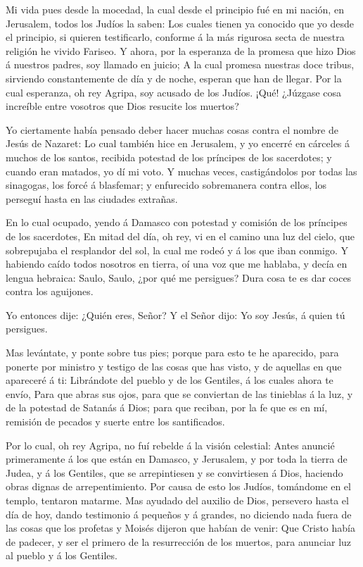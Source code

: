  Mi vida pues desde la mocedad, la cual desde el principio
fué en mi nación, en Jerusalem, todos los Judíos la saben:
 Los cuales tienen ya conocido que yo desde el principio,
si quieren testificarlo, conforme á la más rigurosa secta de nuestra
religión he vivido Fariseo.  Y ahora, por la esperanza de
la promesa que hizo Dios á nuestros padres, soy llamado en juicio;
 A la cual promesa nuestras doce tribus, sirviendo
constantemente de día y de noche, esperan que han de llegar. Por la cual
esperanza, oh rey Agripa, soy acusado de los Judíos. 
¡Qué! ¿Júzgase cosa increíble entre vosotros que Dios resucite los
muertos?

 Yo ciertamente había pensado deber hacer muchas cosas
contra el nombre de Jesús de Nazaret:  Lo cual también
hice en Jerusalem, y yo encerré en cárceles á muchos de los santos,
recibida potestad de los príncipes de los sacerdotes; y cuando eran
matados, yo dí mi voto.  Y muchas veces, castigándolos
por todas las sinagogas, los forcé á blasfemar; y enfurecido sobremanera
contra ellos, los perseguí hasta en las ciudades extrañas.

 En lo cual ocupado, yendo á Damasco con potestad y
comisión de los príncipes de los sacerdotes,  En mitad
del día, oh rey, vi en el camino una luz del cielo, que sobrepujaba el
resplandor del sol, la cual me rodeó y á los que iban conmigo.
 Y habiendo caído todos nosotros en tierra, oí una voz
que me hablaba, y decía en lengua hebraica: Saulo, Saulo, ¿por qué me
persigues? Dura cosa te es dar coces contra los aguijones.

 Yo entonces dije: ¿Quién eres, Señor? Y el Señor dijo:
Yo soy Jesús, á quien tú persigues.

 Mas levántate, y ponte sobre tus pies; porque para esto
te he aparecido, para ponerte por ministro y testigo de las cosas que
has visto, y de aquellas en que apareceré á ti: 
Librándote del pueblo y de los Gentiles, á los cuales ahora te envío,
 Para que abras sus ojos, para que se conviertan de las
tinieblas á la luz, y de la potestad de Satanás á Dios; para que
reciban, por la fe que es en mí, remisión de pecados y suerte entre los
santificados.

 Por lo cual, oh rey Agripa, no fuí rebelde á la visión
celestial:  Antes anuncié primeramente á los que están en
Damasco, y Jerusalem, y por toda la tierra de Judea, y á los Gentiles,
que se arrepintiesen y se convirtiesen á Dios, haciendo obras dignas de
arrepentimiento.  Por causa de esto los Judíos, tomándome
en el templo, tentaron matarme.  Mas ayudado del auxilio
de Dios, persevero hasta el día de hoy, dando testimonio á pequeños y á
grandes, no diciendo nada fuera de las cosas que los profetas y Moisés
dijeron que habían de venir:  Que Cristo había de
padecer, y ser el primero de la resurrección de los muertos, para
anunciar luz al pueblo y á los Gentiles.

